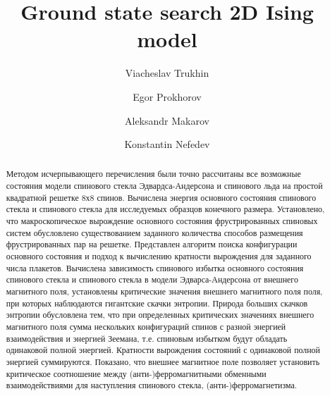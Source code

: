 \documentclass[utf8, babel, sor, jor, amsmath, amssymb, reprint]{elsarticle} %
\begin{document}
\begin{frontmatter}


\title{Ground state search 2D Ising model}

\author[mainaddress, secondaryaddress]{Viacheslav Trukhin}

\author[mainaddress]{Egor Prokhorov}

\author[mainaddress, secondaryaddress]{Aleksandr Makarov}

\author[mainaddress, secondaryaddress]{Konstantin Nefedev}


\address[mainaddress]{Far Eastern Federal University, Vladivostok, Russky Island, 10 Ajax Bay, 690922, the Russian Federation}
\address[secondaryaddress]{Institute of Applied Mathematics, Far Eastern Branch, Russian Academy of Science, Vladivostok, Radio 7, 690041, the Russian Federation}

\begin{abstract}

Методом исчерпывающего перечисления были точно рассчитаны все возможные состояния модели спинового стекла Эдвардса-Андерсона и спинового льда на простой квадратной решетке 8х8 спинов. Вычислена энергия основного состояния спинового стекла и спинового стекла для исследуемых образцов конечного размера. Установлено, что макроскопическое вырождение основного состояния фрустрированных спиновых систем обусловлено существованием заданного количества способов размещения фрустрированных пар на решетке. Представлен алгоритм поиска конфигурации основного состояния и подход к вычислению кратности вырождения для заданного числа плакетов. Вычислена зависимость спинового избытка основного состояния спинового стекла и спинового стекла в модели Эдварса-Андерсона от внешнего магнитного поля, установлены критические значения внешнего магнитного поля поля, при которых наблюдаются гигантские скачки энтропии. Природа больших скачков энтропии обусловлена тем, что при определенных критических значениях внешнего магнитного поля сумма нескольких конфигураций спинов с разной энергией взаимодействия и энергией Зеемана, т.е. спиновым избытком будут обладать одинаковой полной энергией. Кратности вырождения состояний с одинаковой полной энергией суммируются. Показано, что внешнее магнитное поле позволяет установить критическое соотношение между (анти-)ферромагнитными обменными взаимодействиями для наступления спинового стекла, (анти-)ферромагнетизма.  


\end{abstract}
\end{frontmatter}
\end{document}
